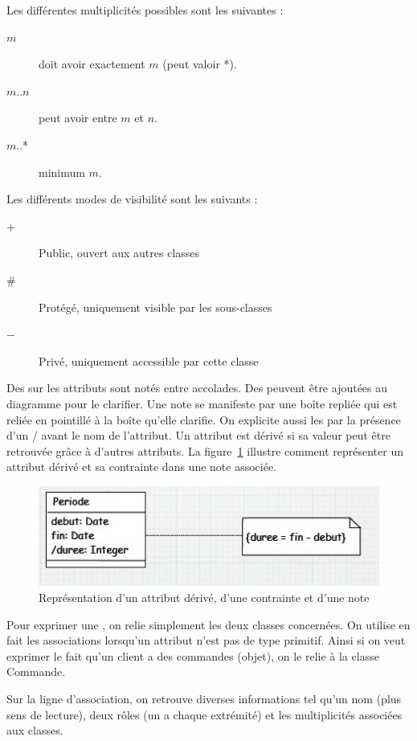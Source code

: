 \hspace*{-.75cm}Les différentes multiplicités possibles sont les suivantes :
\begin{description}
  \item[$m$] doit avoir exactement $m$ (peut valoir *).
  \item[$m$..$n$] peut avoir entre $m$ et $n$.
  \item[$m$..*] minimum $m$.
\end{description}
Les différents modes de visibilité sont les suivants :
\begin{description}
  \item[+]	Public, ouvert aux autres classes
  \item[\#]	Protégé, uniquement visible par les sous-classes
  \item[$-$]	Privé, uniquement accessible par cette classe
\end{description}
Des  sur les attributs sont notés entre accolades.
Des  peuvent être ajoutées au diagramme pour le clarifier.
Une note se manifeste par une boîte repliée qui est
reliée en pointillé à la boîte qu'elle clarifie.
On explicite aussi les  par la présence
d'un / avant le nom de l'attribut.
Un attribut est dérivé si sa valeur peut être retrouvée
grâce à d'autres attributs.
La figure~\ref{diagramme_classes_addon} illustre
comment représenter un attribut dérivé et sa contrainte dans une note associée.
\begin{figure}[h]
  \centering
  \includegraphics[scale=1]{diagramme_classes_addon.jpg}
  \caption{Représentation d'un attribut dérivé, d'une contrainte et d'une note}
  \label{diagramme_classes_addon}
\end{figure}

Pour exprimer une ,
on relie simplement les deux classes concernées.
On utilise en fait les associations lorsqu'un attribut n'est pas de type primitif.
Ainsi si on veut exprimer le fait qu'un client a des commandes (objet),
on le relie à la classe Commande.

Sur la ligne d'association,
on retrouve diverses informations tel qu'un nom (plus sens de lecture),
deux rôles (un a chaque extrémité) et les multiplicités associées aux classes.


